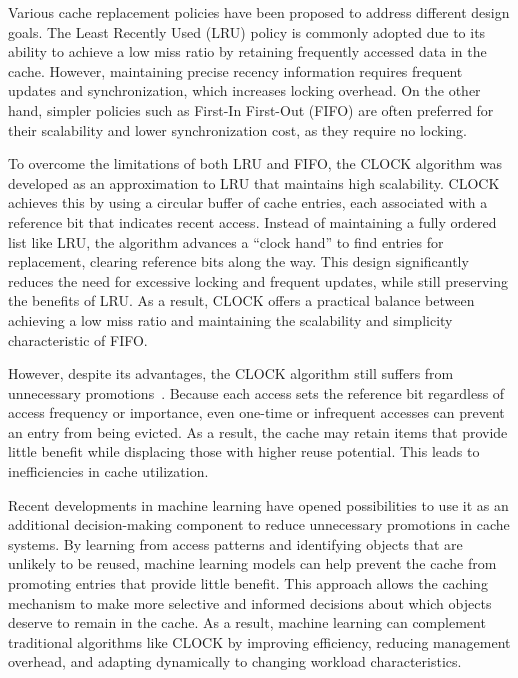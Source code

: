 Various cache replacement policies have been proposed to address
different design goals. The Least Recently Used (LRU) policy is
commonly adopted due to its ability to achieve a low miss ratio by
retaining frequently accessed data in the cache. However,
maintaining precise recency information requires frequent updates and
synchronization, which increases locking overhead. On the other hand,
simpler policies such as First-In First-Out (FIFO) are often
preferred for their scalability and lower synchronization cost, as
they require no locking.

To overcome the limitations of both LRU and FIFO, the CLOCK algorithm
was developed as an approximation to LRU that maintains high
scalability. CLOCK achieves this by using a circular
buffer of cache entries, each associated with a reference bit that
indicates recent access. Instead of maintaining a fully ordered list
like LRU, the algorithm advances a “clock hand” to find entries for
replacement, clearing reference bits along the way. This design
significantly reduces the need for excessive locking and frequent
updates, while still preserving the benefits of
LRU. As a result, CLOCK offers a practical balance between achieving
a low miss ratio and maintaining the scalability and simplicity
characteristic of FIFO.

However, despite its advantages, the CLOCK algorithm still suffers
from unnecessary promotions~\cite{chen2025lazy}. Because each access
sets the reference bit regardless of access frequency or importance,
even one-time or infrequent accesses can prevent an entry from being
evicted. As a result, the cache may retain items that provide little
benefit while displacing those with higher reuse potential. This leads to
inefficiencies in cache utilization.

Recent developments in machine learning have opened possibilities to
use it as an additional decision-making component to reduce
unnecessary promotions in cache systems. By learning from
access patterns and identifying objects that are unlikely to be
reused, machine learning models can help prevent the cache from
promoting entries that provide little benefit. This approach allows
the caching mechanism to make more selective and informed decisions
about which objects deserve to remain in the cache. As a result,
machine learning can complement traditional algorithms like CLOCK by
improving efficiency, reducing management overhead, and adapting
dynamically to changing workload characteristics.

